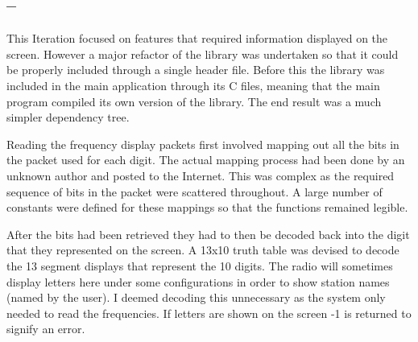 \subsection*{ -- }

This Iteration focused on features that required information displayed on the screen. However a major refactor of the library  was undertaken so that it could be properly included through a single header file. Before this the library was included in the main application through its C files, meaning that the main program compiled its own version of the library. The end result was a much simpler dependency tree.

Reading the frequency display packets first involved mapping out all the bits in the packet used for each digit. The actual mapping process had been done by an unknown author and posted to the Internet. This was complex as the required sequence of bits in the packet were scattered throughout. A large number of constants were defined for these mappings so that the functions remained legible. 


After the bits had been retrieved they had to then be decoded back into the digit that they represented on the screen. A 13x10 truth table was devised to decode the 13 segment displays that represent the 10 digits. The radio will sometimes display letters here under some configurations in order to show station names (named by the user). I deemed decoding this unnecessary as the system only needed to read the frequencies. If letters are shown on the screen -1 is returned to signify an error.

